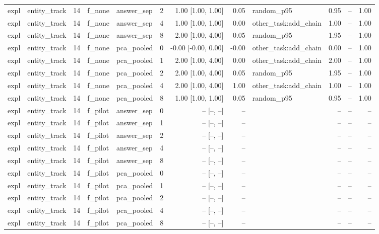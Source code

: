 \begin{tabular}{llrllrrrlrrr}
expl & entity\_track & 14 & f\_none & answer\_sep & 2 & 1.00 [1.00, 1.00] & 0.05 & random\_p95 & 0.95 & -- & 1.00 \\
expl & entity\_track & 14 & f\_none & answer\_sep & 4 & 1.00 [1.00, 1.00] & 0.00 & other\_task:add\_chain & 1.00 & -- & 1.00 \\
expl & entity\_track & 14 & f\_none & answer\_sep & 8 & 2.00 [1.00, 4.00] & 0.05 & random\_p95 & 1.95 & -- & 1.00 \\
expl & entity\_track & 14 & f\_none & pca\_pooled & 0 & -0.00 [-0.00, 0.00] & -0.00 & other\_task:add\_chain & 0.00 & -- & 1.00 \\
expl & entity\_track & 14 & f\_none & pca\_pooled & 1 & 2.00 [1.00, 4.00] & 0.00 & other\_task:add\_chain & 2.00 & -- & 1.00 \\
expl & entity\_track & 14 & f\_none & pca\_pooled & 2 & 2.00 [1.00, 4.00] & 0.05 & random\_p95 & 1.95 & -- & 1.00 \\
expl & entity\_track & 14 & f\_none & pca\_pooled & 4 & 2.00 [1.00, 4.00] & 1.00 & other\_task:add\_chain & 1.00 & -- & 1.00 \\
expl & entity\_track & 14 & f\_none & pca\_pooled & 8 & 1.00 [1.00, 1.00] & 0.05 & random\_p95 & 0.95 & -- & 1.00 \\
expl & entity\_track & 14 & f\_pilot & answer\_sep & 0 & -- [--, --] & -- &  & -- & -- & -- \\
expl & entity\_track & 14 & f\_pilot & answer\_sep & 1 & -- [--, --] & -- &  & -- & -- & -- \\
expl & entity\_track & 14 & f\_pilot & answer\_sep & 2 & -- [--, --] & -- &  & -- & -- & -- \\
expl & entity\_track & 14 & f\_pilot & answer\_sep & 4 & -- [--, --] & -- &  & -- & -- & -- \\
expl & entity\_track & 14 & f\_pilot & answer\_sep & 8 & -- [--, --] & -- &  & -- & -- & -- \\
expl & entity\_track & 14 & f\_pilot & pca\_pooled & 0 & -- [--, --] & -- &  & -- & -- & -- \\
expl & entity\_track & 14 & f\_pilot & pca\_pooled & 1 & -- [--, --] & -- &  & -- & -- & -- \\
expl & entity\_track & 14 & f\_pilot & pca\_pooled & 2 & -- [--, --] & -- &  & -- & -- & -- \\
expl & entity\_track & 14 & f\_pilot & pca\_pooled & 4 & -- [--, --] & -- &  & -- & -- & -- \\
expl & entity\_track & 14 & f\_pilot & pca\_pooled & 8 & -- [--, --] & -- &  & -- & -- & -- \\

\end{tabular}
